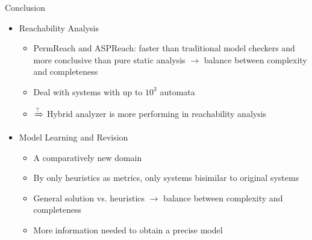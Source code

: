 \documentclass[8pt]{beamer}
\begin{document}
\begin{frame}{Conclusion}
\begin{itemize}
    \item Reachability Analysis
    \begin{itemize}
        \item<+-> PermReach and ASPReach: faster than traditional model checkers and more conclusive than pure static analysis $\to$ balance between complexity and completeness
        \item<+-> Deal with systems with up to $10^3$ automata
        \item<+-> $\xRightarrow{\text{?}}$ Hybrid analyzer is more performing in reachability analysis
    \end{itemize}
    \item<+-> Model Learning and Revision
    \begin{itemize}
        \item<+-> A comparatively new domain
        \item<+-> By only heuristics as metrics, only systems bisimilar to original systems
        \item<+-> General solution vs. heuristics $\to$ balance between complexity and completeness
        \item<+-> More information needed to obtain a precise model 
    \end{itemize}
\end{itemize}
\end{frame}
\end{document}
